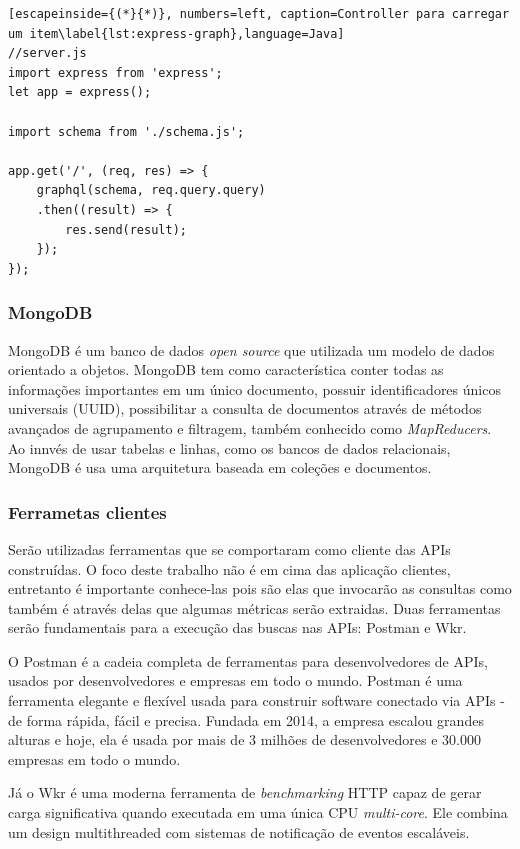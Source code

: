 \begin{lstlisting}[escapeinside={(*}{*)}, numbers=left, caption=Controller para carregar um item\label{lst:express-graph},language=Java]
//server.js
import express from 'express';
let app = express();

import schema from './schema.js';

app.get('/', (req, res) => {
    graphql(schema, req.query.query)
    .then((result) => {
        res.send(result);
    });
});

\end{lstlisting}

\subsubsection*{MongoDB}

MongoDB é um banco de dados \textit{open source} que utilizada um modelo de dados orientado a objetos. MongoDB tem como característica conter todas as informações importantes em um único documento, possuir identificadores únicos universais (UUID), possibilitar a consulta de documentos através de métodos avançados de agrupamento e filtragem, também conhecido como \textit{MapReducers}. Ao innvés de usar tabelas e linhas, como os bancos de dados relacionais, MongoDB é usa uma arquitetura baseada em coleções e documentos.


\subsubsection*{Ferrametas clientes}

Serão utilizadas ferramentas que se comportaram como cliente das APIs construídas. O foco deste trabalho não é em cima das aplicação clientes, entretanto é importante conhece-las pois são elas que invocarão as consultas como também é através delas que algumas métricas serão extraidas. Duas ferramentas serão fundamentais para a execução das buscas nas APIs: Postman e Wkr.

O Postman é a cadeia completa de ferramentas para desenvolvedores de APIs, usados por desenvolvedores e empresas em todo o mundo. Postman é uma ferramenta elegante e flexível usada para construir software conectado via APIs - de forma rápida, fácil e precisa. Fundada em 2014, a empresa escalou grandes alturas e hoje, ela é usada por mais de 3 milhões de desenvolvedores e 30.000 empresas em todo o mundo.

Já o Wkr é uma moderna ferramenta de \textit{benchmarking} HTTP capaz de gerar carga significativa quando executada em uma única CPU \textit{multi-core}. Ele combina um design multithreaded com sistemas de notificação de eventos escaláveis.


